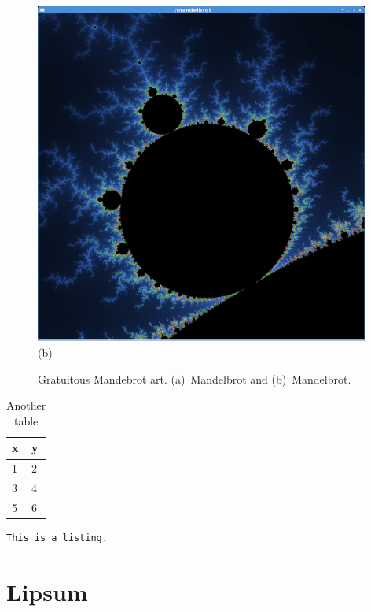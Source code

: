 \begin{figure}
\begin{minipage}{0.5\textwidth}
\includegraphics[width=0.98\textwidth]{figures/mandelbrot.png}
\\ (b)
\end{minipage}%
\caption{Gratuitous Mandebrot art.
(a)~Mandelbrot and (b)~Mandelbrot.}
\end{figure}

\begin{table}\centering%
\begin{tabular}{|l|l|}%
\hline
x & y \\
\hline
1 & 2 \\
3 & 4 \\
5 & 6 \\
\hline
\end{tabular}%
\caption{Another table}
\end{table}

\begin{lstlisting}[caption={Some caption.},frame=single]
This is a listing.
\end{lstlisting}



\section{Lipsum}

\lipsum
\lipsum
\lipsum
\lipsum
